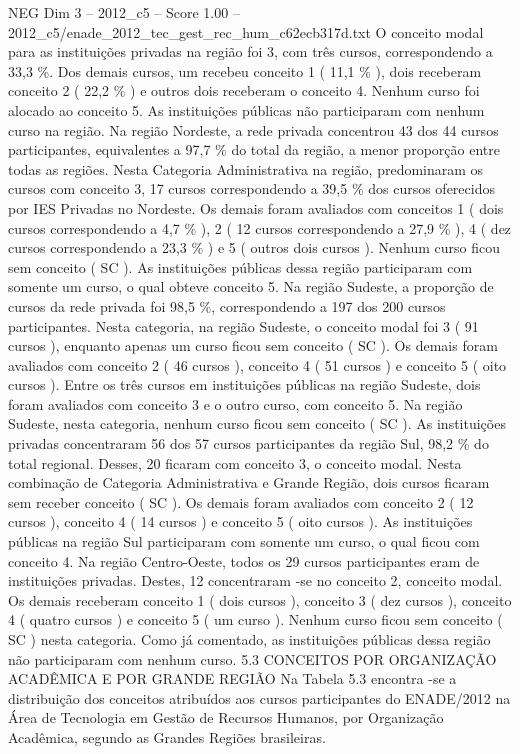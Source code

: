 \begin{textsample}{NEG Dim 3 – 2012\_c5 – Score 1.00 – 2012\_c5/enade\_2012\_tec\_gest\_rec\_hum\_c62ecb317d.txt}
O conceito modal para as instituições privadas na região foi 3, com três cursos, correspondendo a 33,3 \%.
Dos demais cursos, um recebeu conceito 1 ( 11,1 \% ), dois receberam conceito 2 ( 22,2 \% ) e outros dois receberam o conceito 4.
Nenhum curso foi alocado ao conceito 5.
As instituições públicas não participaram com nenhum curso na região.
Na região Nordeste, a rede privada concentrou 43 dos 44 cursos participantes, equivalentes a 97,7 \% do total da região, a menor proporção entre todas as regiões.
Nesta Categoria Administrativa na região, predominaram os cursos com conceito 3, 17 cursos correspondendo a 39,5 \% dos cursos oferecidos por IES Privadas no Nordeste.
Os demais foram avaliados com conceitos 1 ( dois cursos correspondendo a 4,7 \% ), 2 ( 12 cursos correspondendo a 27,9 \% ), 4 ( dez cursos correspondendo a 23,3 \% ) e 5 ( outros dois cursos ).
Nenhum curso ficou sem conceito ( SC ).
As instituições públicas dessa região participaram com somente um curso, o qual obteve conceito 5.
Na região Sudeste, a proporção de cursos da rede privada foi 98,5 \%, correspondendo a 197 dos 200 cursos participantes.
Nesta categoria, na região Sudeste, o conceito modal foi 3 ( 91 cursos ), enquanto apenas um curso ficou sem conceito ( SC ).
Os demais foram avaliados com conceito 2 ( 46 cursos ), conceito 4 ( 51 cursos ) e conceito 5 ( oito cursos ).
Entre os três cursos em instituições públicas na região Sudeste, dois foram avaliados com conceito 3 e o outro curso, com conceito 5.
Na região Sudeste, nesta categoria, nenhum curso ficou sem conceito ( SC ).
As instituições privadas concentraram 56 dos 57 cursos participantes da região Sul, 98,2 \% do total regional.
Desses, 20 ficaram com conceito 3, o conceito modal.
Nesta combinação de Categoria Administrativa e Grande Região, dois cursos ficaram sem receber conceito ( SC ).
Os demais foram avaliados com conceito 2 ( 12 cursos ), conceito 4 ( 14 cursos ) e conceito 5 ( oito cursos ).
As instituições públicas na região Sul participaram com somente um curso, o qual ficou com conceito 4.
Na região Centro-Oeste, todos os 29 cursos participantes eram de instituições privadas.
Destes, 12 concentraram -se no conceito 2, conceito modal.
Os demais receberam conceito 1 ( dois cursos ), conceito 3 ( dez cursos ), conceito 4 ( quatro cursos ) e conceito 5 ( um curso ).
Nenhum curso ficou sem conceito ( SC ) nesta categoria.
Como já comentado, as instituições públicas dessa região não participaram com nenhum curso. 5.3 CONCEITOS POR ORGANIZAÇÃO ACADÊMICA E POR GRANDE REGIÃO Na Tabela 5.3 encontra -se a distribuição dos conceitos atribuídos aos cursos participantes do ENADE/2012 na Área de Tecnologia em Gestão de Recursos Humanos, por Organização Acadêmica, segundo as Grandes Regiões brasileiras.

\end{textsample}
